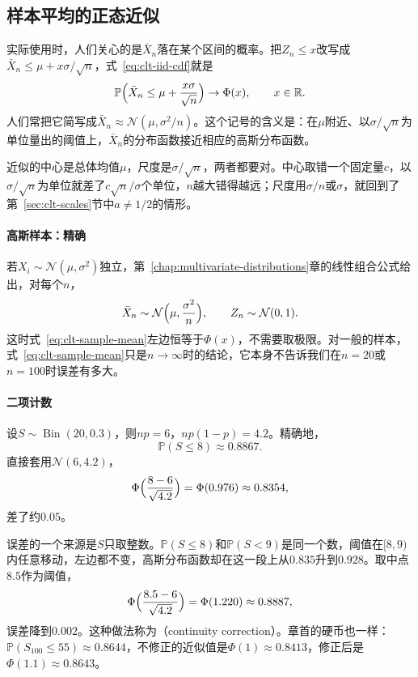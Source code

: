 \subsection{样本平均的正态近似}
\label{sec:clt-sample-mean}

实际使用时，人们关心的是$\bar{X}_n$落在某个区间的概率。把$Z_n\leq x$改写成$\bar{X}_n\leq\mu+x\sigma/\sqrt{n}$，式~\eqref{eq:clt-iid-cdf}就是
\begin{equation}
 \mathbb{P}\Bigl(\bar{X}_n\leq\mu+\frac{x\sigma}{\sqrt{n}}\Bigr)\to\Phi(x),\qquad x\in\mathbb{R} .
 \label{eq:clt-sample-mean}
\end{equation}
人们常把它简写成$\bar{X}_n\approx\mathcal{N}(\mu,\sigma^2/n)$。这个记号的含义是：在$\mu$附近、以$\sigma/\sqrt{n}$为单位量出的阈值上，$\bar{X}_n$的分布函数接近相应的高斯分布函数。

近似的中心是总体均值$\mu$，尺度是$\sigma/\sqrt{n}$，两者都要对。中心取错一个固定量$c$，以$\sigma/\sqrt{n}$为单位就差了$c\sqrt{n}/\sigma$个单位，$n$越大错得越远；尺度用$\sigma/n$或$\sigma$，就回到了第~\ref{sec:clt-scales}节中$a\neq1/2$的情形。

\paragraph{高斯样本：精确}
若$X_i\sim\mathcal{N}(\mu,\sigma^2)$独立，第~\ref{chap:multivariate-distributions}章的线性组合公式给出，对每个$n$，
\[
 \bar{X}_n\sim\mathcal{N}\Bigl(\mu,\frac{\sigma^2}{n}\Bigr),\qquad Z_n\sim\mathcal{N}(0,1) .
\]
这时式~\eqref{eq:clt-sample-mean}左边恒等于$\Phi(x)$，不需要取极限。对一般的样本，式~\eqref{eq:clt-sample-mean}只是$n\to\infty$时的结论，它本身不告诉我们在$n=20$或$n=100$时误差有多大。

\paragraph{二项计数}
设$S\sim\operatorname{Bin}(20,0.3)$，则$np=6$，$np(1-p)=4.2$。精确地，
\[
 \mathbb{P}(S\leq8)\approx0.8867 .
\]
直接套用$\mathcal{N}(6,4.2)$，
\[
 \Phi\Bigl(\frac{8-6}{\sqrt{4.2}}\Bigr)=\Phi(0.976)\approx0.8354 ,
\]
差了约$0.05$。

误差的一个来源是$S$只取整数。$\mathbb{P}(S\leq8)$和$\mathbb{P}(S<9)$是同一个数，阈值在$[8,9)$内任意移动，左边都不变，高斯分布函数却在这一段上从$0.835$升到$0.928$。取中点$8.5$作为阈值，
\[
 \Phi\Bigl(\frac{8.5-6}{\sqrt{4.2}}\Bigr)=\Phi(1.220)\approx0.8887 ,
\]
误差降到$0.002$。这种做法称为（continuity correction）。章首的硬币也一样：$\mathbb{P}(S_{100}\leq55)\approx0.8644$，不修正的近似值是$\Phi(1)\approx0.8413$，修正后是$\Phi(1.1)\approx0.8643$。


